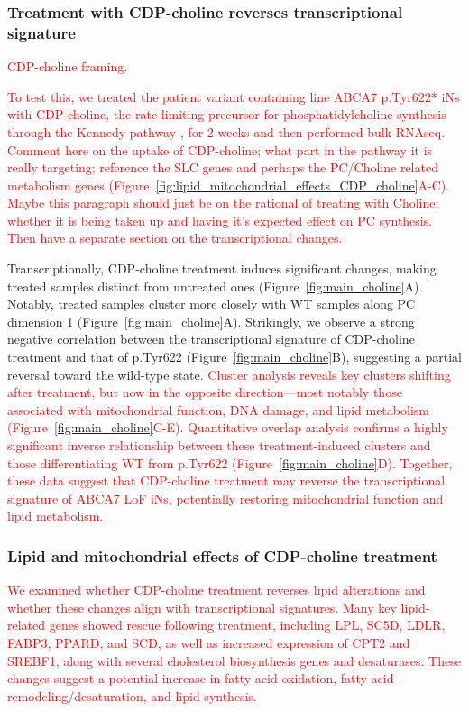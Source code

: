 \subsubsection{Treatment with CDP-choline reverses transcriptional signature}
\textcolor{red}{CDP-choline framing.}

\textcolor{red}{To test this, we treated the patient variant containing line ABCA7 p.Tyr622* iNs with CDP-choline, the rate-limiting precursor for phosphatidylcholine synthesis through the Kennedy pathway \cite{Zeisel2009-xv,Son2024-tu}, for 2 weeks and then performed bulk RNAseq. Comment here on the uptake of CDP-choline; what part in the pathway it is really targeting; reference the SLC genes and perhaps the PC/Choline related metabolism genes (Figure~\ref{fig:lipid_mitochondrial_effects_CDP_choline}A-C). Maybe this paragraph should just be on the rational of treating with Choline; whether it is being taken up and having it's expected effect on PC synthesis. Then have a separate section on the transcriptional changes.}

Transcriptionally, CDP-choline treatment induces significant changes, making treated samples distinct from untreated ones (Figure~\ref{fig:main_choline}A). Notably, treated samples cluster more closely with WT samples along PC dimension 1 (Figure~\ref{fig:main_choline}A). Strikingly, we observe a strong negative correlation between the transcriptional signature of CDP-choline treatment and that of p.Tyr622 (Figure~\ref{fig:main_choline}B), suggesting a partial reversal toward the wild-type state. \textcolor{red}{Cluster analysis reveals key clusters shifting after treatment, but now in the opposite direction—most notably those associated with mitochondrial function, DNA damage, and lipid metabolism (Figure~\ref{fig:main_choline}C-E). Quantitative overlap analysis confirms a highly significant inverse relationship between these treatment-induced clusters and those differentiating WT from p.Tyr622 (Figure~\ref{fig:main_choline}D). Together, these data suggest that CDP-choline treatment may reverse the transcriptional signature of ABCA7 LoF iNs, potentially restoring mitochondrial function and lipid metabolism.}

\subsubsection{Lipid and mitochondrial effects of CDP-choline treatment}
\textcolor{red}{We examined whether CDP-choline treatment reverses lipid alterations and whether these changes align with transcriptional signatures. Many key lipid-related genes showed rescue following treatment, including LPL, SC5D, LDLR, FABP3, PPARD, and SCD, as well as increased expression of CPT2 and SREBF1, along with several cholesterol biosynthesis genes and desaturases. These changes suggest a potential increase in fatty acid oxidation, fatty acid remodeling/desaturation, and lipid synthesis.} 

